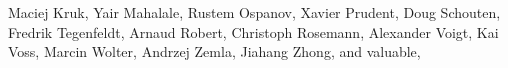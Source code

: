 \begin{center}
{Maciej Kruk,%
Yair Mahalale,%
Rustem Ospanov,%
Xavier Prudent,%
Doug Schouten,%
Fredrik Tegenfeldt,%
Arnaud Robert,%
Christoph Rosemann,%
Alexander Voigt,%
Kai Voss,%
Marcin Wolter,%
Andrzej Zemla,%
Jiahang Zhong,%
and valuable,%
}
\end{center}

\thispagestyle{empty}
\newpage

